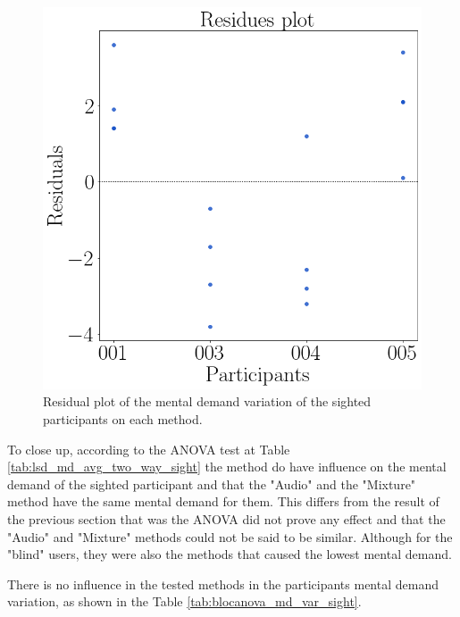 \begin{figure}[!htb]
\begin{minipage}{0.45\textwidth}
        \includegraphics[width = 0.8\linewidth]{Resultados/Nasa/Figuras/png/residplot_md_var_sight.png}
        \caption{Residual plot of the mental demand variation of the sighted participants on each method.}
        \label{fig:residplot_md_var_sight}
    \end{minipage}
\end{figure}


%

To close up, according to the ANOVA test at Table \ref{tab:lsd_md_avg_two_way_sight} the method do have influence on the mental demand of the sighted participant and that the "Audio" and the "Mixture" method have the same mental demand for them. This differs from the result of the previous section that was the ANOVA did not prove any effect and that the "Audio" and "Mixture" methods could not be said to be similar. Although for the "blind" users, they were also the methods that caused the lowest mental demand.

There is no influence in the tested methods in the participants mental demand variation, as shown in the Table \ref{tab:blocanova_md_var_sight}.

\FloatBarrier



